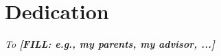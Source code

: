 
\clearpage
\thispagestyle{plain}
\section*{Dedication}
{}

\vspace{2in}

\begin{center}
\textit{To \textbf{[FILL: e.g., my parents, my advisor, ...]}}
\end{center}

\clearpage
